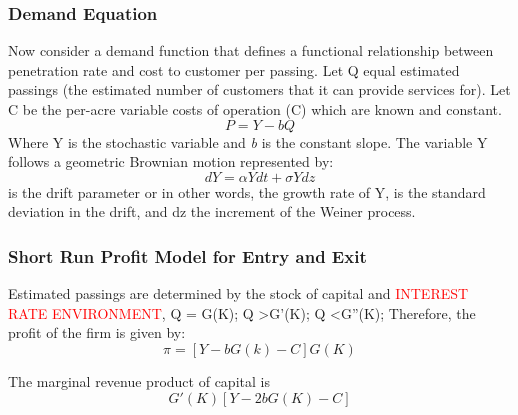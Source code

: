\documentclass[a4paper,oneside]{article}
\newcommand\myworries[1]{\textcolor{red}{#1}}
\begin{document}
\subsubsection{Demand Equation}
\:\:\:\:\:\:Now consider a demand function that defines a functional relationship between penetration rate and cost to customer per passing.
Let Q equal estimated passings (the estimated number of customers that it can provide services for).
Let C be the per-acre variable costs of operation (C) which are known and constant.
\begin{equation}
	P = Y - bQ
\end{equation}
	Where Y is the stochastic variable and \emph{b} is the constant slope. The variable Y follows a geometric Brownian motion represented by:
\begin{equation}
	dY = \alpha Y dt + \sigma Y dz
\end{equation}
	\textalpha\:\: is the drift parameter or in other words, the growth rate of Y, \textsigma \:\: is the standard deviation in the drift, and dz the increment of the Weiner process.

\subsubsection{Short Run Profit Model for Entry and Exit}
\:\:\:\:\:\:	Estimated passings are determined by the stock of capital and \myworries{INTEREST RATE ENVIRONMENT},
	Q = G(K); \:\:\:\:\:\: Q \textgreater G'(K); \:\:\:\:\:\: Q \textless G''(K);
	Therefore, the profit of the firm is given by:
\begin{equation}
	\pi = [Y - bG(k)-C]G(K)
\end{equation}

The marginal revenue product of capital is \begin{equation}G'(K)[Y-2bG(K)-C]\end{equation}
\end{document}
